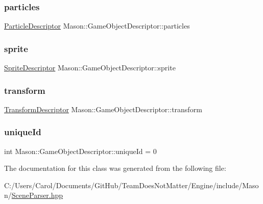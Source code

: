 \subsubsection{\texorpdfstring{particles}{particles}}
{\footnotesize\ttfamily \hyperlink{class_mason_1_1_particle_descriptor}{Particle\+Descriptor} Mason\+::\+Game\+Object\+Descriptor\+::particles}

\hypertarget{class_mason_1_1_game_object_descriptor_aa7e89568fa330d9337093a73b63f2d3e}{}\label{class_mason_1_1_game_object_descriptor_aa7e89568fa330d9337093a73b63f2d3e} 
\subsubsection{\texorpdfstring{sprite}{sprite}}
{\footnotesize\ttfamily \hyperlink{class_mason_1_1_sprite_descriptor}{Sprite\+Descriptor} Mason\+::\+Game\+Object\+Descriptor\+::sprite}

\hypertarget{class_mason_1_1_game_object_descriptor_aa22b35eef207a8451a3ad6b816ecd5ac}{}\label{class_mason_1_1_game_object_descriptor_aa22b35eef207a8451a3ad6b816ecd5ac} 
\subsubsection{\texorpdfstring{transform}{transform}}
{\footnotesize\ttfamily \hyperlink{class_mason_1_1_transform_descriptor}{Transform\+Descriptor} Mason\+::\+Game\+Object\+Descriptor\+::transform}

\hypertarget{class_mason_1_1_game_object_descriptor_aafbd17cd506939c46ce70b550762e2d1}{}\label{class_mason_1_1_game_object_descriptor_aafbd17cd506939c46ce70b550762e2d1} 
\subsubsection{\texorpdfstring{unique\+Id}{uniqueId}}
{\footnotesize\ttfamily int Mason\+::\+Game\+Object\+Descriptor\+::unique\+Id = 0}



The documentation for this class was generated from the following file\+:\begin{DoxyCompactItemize}
\item 
C\+:/\+Users/\+Carol/\+Documents/\+Git\+Hub/\+Team\+Does\+Not\+Matter/\+Engine/include/\+Mason/\hyperlink{_scene_parser_8hpp}{Scene\+Parser.\+hpp}\end{DoxyCompactItemize}
